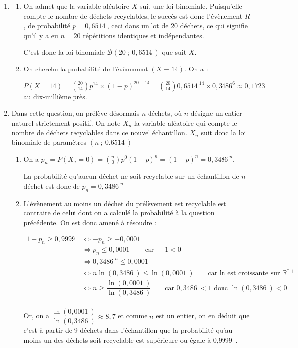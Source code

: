 \documentclass[10pt]{article}
\providecommand{\R}{\mathbb{R}}
\providecommand{\np}[2][]{{#2~#1}}
\begin{document}
\begin{enumerate}
\item
	\begin{enumerate}
		\item On admet que la variable aléatoire $X$ suit une loi binomiale. Puisqu'elle compte le nombre de déchets recyclables, le succès est donc l'évènement $R$, de probabilité $p = \np{0,6514}$, ceci dans un lot de 20 déchets, ce qui signifie qu'il y a eu $n = 20$ répétitions identiques et indépendantes.

C'est donc la loi binomiale $\mathcal{B}(20~;~\np{0,6514})$ que suit $X$.

		\item On cherche la probabilité de l'évènement $(X = 14)$. On a :

$P(X=14) = \displaystyle \binom{20}{14} p^{14}\times (1-p)^{20 - 14} = \binom{20}{14} \np{0,6514}^{14}\times 0,3486^{6} \approx 0,1723$ au dix-millième près.
	\end{enumerate}
\item Dans cette question, on prélève désormais $n$ déchets, où $n$ désigne un entier naturel strictement positif. On note $X_n$ la variable aléatoire qui compte le nombre de déchets recyclables dans ce nouvel échantillon. $X_n$ suit donc la loi binomiale de paramètres $(n~;~\np{0.6514})$
	\begin{enumerate}
		\item On a $p_{n} = P(X_n = 0) = \displaystyle \binom{n}{0} p^0 (1 - p)^{n} = (1 - p)^n = \np{0,3486}^n$.

La probabilité qu'aucun déchet ne soit recyclable sur un échantillon de $n$ déchet est donc de $p_n = \np{0,3486}^n$

		\item L'évènement \og au moins un déchet du prélèvement est recyclable \fg{} est contraire de celui dont on a calculé la probabilité à la question précédente. On est donc amené à résoudre :

$\begin{aligned} 1 - p_n \geqslant \np{0,9999} &\iff -p_n \geqslant -\np{0,0001}\\
&\iff p_n \leqslant \np{0,0001} \qquad \text{car }-1<0\\
&\iff \np{0,3486}^n \leqslant \np{0,0001}\\
&\iff n \ln(\np{0,3486}) \leqslant \ln(\np{0,0001}) \qquad \text{car ln est croissante sur } \R^{*+}\\
&\iff n \geqslant \dfrac{\ln(\np{0,0001})}{\ln(\np{0,3486})} \qquad \text{car } \np{0,3486}<1 \text{ donc } \ln(\np{0,3486})<0
\\ \end{aligned}$

Or, on a $\dfrac{\ln(\np{0,0001})}{\ln(\np{0,3486})} \approx 8,7$ et comme $n$ est un entier, on en déduit que c'est à partir de 9 déchets dans l'échantillon que la probabilité qu'au moins un des déchets soit recyclable est supérieure ou égale à \np{0,9999}.
	\end{enumerate}
\end{enumerate}

\bigskip
\end{document}
